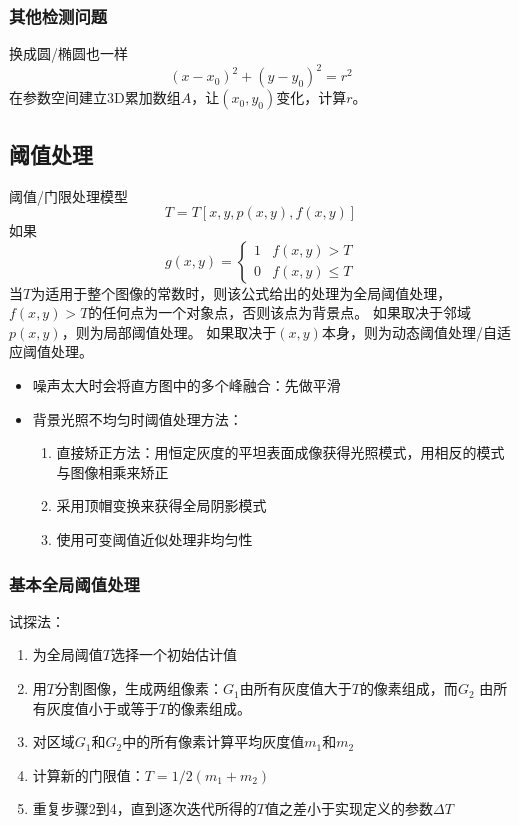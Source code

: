 \subsubsection{其他检测问题}
换成圆/椭圆也一样
\[(x-x_0)^2+(y-y_0)^2=r^2\]
在参数空间建立3D累加数组$A$，让$(x_0,y_0)$变化，计算$r$。


\subsection{阈值处理}
阈值/门限处理模型
\[T=T[x,y,p(x,y),f(x,y)]\]
如果
\[g(x,y)=\begin{cases}
1 & f(x,y)>T\\
0 & f(x,y)\leq T
\end{cases}\]
当$T$为适用于整个图像的常数时，则该公式给出的处理为全局阈值处理，$f(x,y)>T$的任何点为一个对象点，否则该点为背景点。
如果取决于邻域$p(x,y)$，则为局部阈值处理。
如果取决于$(x,y)$本身，则为动态阈值处理/自适应阈值处理。

\begin{itemize}
\item 噪声太大时会将直方图中的多个峰融合：先做平滑
\item 背景光照不均匀时阈值处理方法：
\begin{enumerate}
	\item 直接矫正方法：用恒定灰度的平坦表面成像获得光照模式，用相反的模式与图像相乘来矫正
	\item 采用顶帽变换来获得全局阴影模式
	\item 使用可变阈值近似处理非均匀性
\end{enumerate}
\end{itemize}

\subsubsection{基本全局阈值处理}
试探法：
\begin{enumerate}
	\item 为全局阈值$T$选择一个初始估计值
	\item 用$T$分割图像，生成两组像素：$G_1$由所有灰度值大于$T$的像素组成，而$G_2$   由所有灰度值小于或等于$T$的像素组成。
	\item 对区域$G_1$和$G_2$中的所有像素计算平均灰度值$m_1$和$m_2$
	\item 计算新的门限值：$T=1/2(m_1+m_2)$
	\item 重复步骤2到4，直到逐次迭代所得的$T$值之差小于实现定义的参数$\Delta T$
\end{enumerate}


